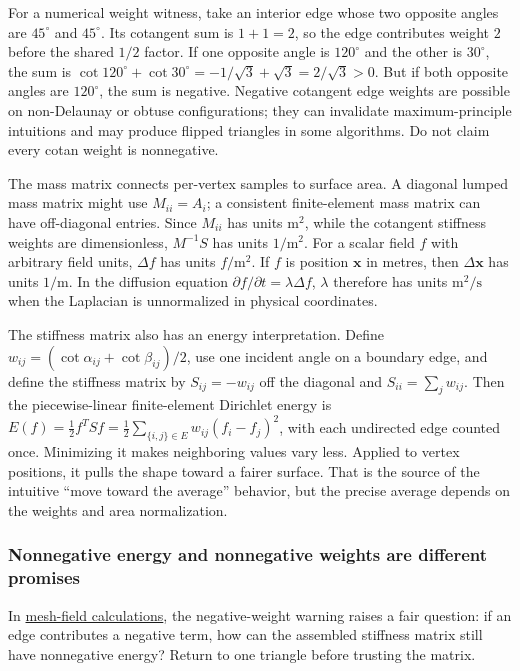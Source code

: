 For a numerical weight witness, take an interior edge whose two opposite angles are \(45^\circ\) and \(45^\circ\). Its cotangent sum is \(1+1=2\), so the edge contributes weight \(2\) before the shared \(1/2\) factor. If one opposite angle is \(120^\circ\) and the other is \(30^\circ\), the sum is \(\cot120^\circ+\cot30^\circ=-1/\sqrt3+\sqrt3=2/\sqrt3>0\). But if both opposite angles are \(120^\circ\), the sum is negative. Negative cotangent edge weights are possible on non-Delaunay or obtuse configurations; they can invalidate maximum-principle intuitions and may produce flipped triangles in some algorithms. Do not claim every cotan weight is nonnegative.

The mass matrix connects per-vertex samples to surface area. A diagonal lumped mass matrix might use \(M_{ii}=A_i\); a consistent finite-element mass matrix can have off-diagonal entries. Since \(M_{ii}\) has units \(\mathrm m^2\), while the cotangent stiffness weights are dimensionless, \(M^{-1}S\) has units \(1/\mathrm m^2\). For a scalar field \(f\) with arbitrary field units, \(\Delta f\) has units \(f/\mathrm m^2\). If \(f\) is position \(\mathbf x\) in metres, then \(\Delta\mathbf x\) has units \(1/\mathrm m\). In the diffusion equation \(\partial f/\partial t=\lambda\Delta f\), \(\lambda\) therefore has units \(\mathrm m^2/\mathrm s\) when the Laplacian is unnormalized in physical coordinates.

The stiffness matrix also has an energy interpretation. Define \(w_{ij}=(\cot\alpha_{ij}+\cot\beta_{ij})/2\), use one incident angle on a boundary edge, and define the stiffness matrix by \(S_{ij}=-w_{ij}\) off the diagonal and \(S_{ii}=\sum_j w_{ij}\). Then the piecewise-linear finite-element Dirichlet energy is \(E(f)=\frac12 f^T S f=\frac12\sum_{\{i,j\}\in E}w_{ij}(f_i-f_j)^2\), with each undirected edge counted once. Minimizing it makes neighboring values vary less. Applied to vertex positions, it pulls the shape toward a fairer surface. That is the source of the intuitive ``move toward the average'' behavior, but the precise average depends on the weights and area normalization.

\subsubsection{Nonnegative energy and nonnegative weights are different promises}\label{03-visual-computing-i-ch002-nonnegative-energy-and-nonnegative-weights-are-different-promises}

In \hyperref[appendix-1988d465c119]{mesh-field calculations}, the negative-weight warning raises a fair question: if an edge contributes a negative term, how can the assembled stiffness matrix still have nonnegative energy? Return to one triangle before trusting the matrix.

